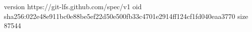 version https://git-lfs.github.com/spec/v1
oid sha256:022e48e911bc0e88be5ef22d50e500fb33c4701e2914ff124cf1fd040eaa3770
size 87544

